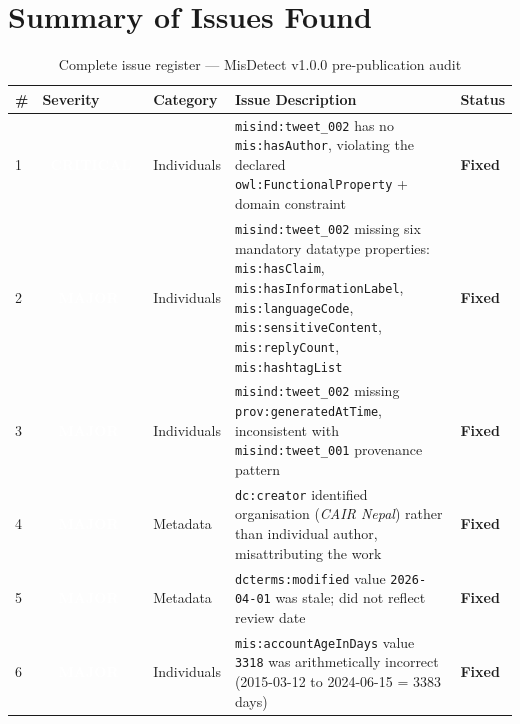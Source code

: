 \documentclass[11pt, a4paper]{article}
\newcommand{\badgeCritical}{\textcolor{white}{\colorbox{severity-critical}{\footnotesize\textbf{\ CRITICAL\ }}}}
\newcommand{\badgeMajor}{\textcolor{white}{\colorbox{severity-major}{\footnotesize\textbf{\ \ MAJOR\ \ }}}}
\newcommand{\prop}[1]{\texttt{mis:#1}}
\newcommand{\ind}[1]{\texttt{misind:#1}}
\begin{document}
\section{Summary of Issues Found}

\begin{table}[H]
\centering
\caption{Complete issue register --- MisDetect v1.0.0 pre-publication audit}
\label{tab:issue-register}
\setlength{\tabcolsep}{5pt}
\renewcommand{\arraystretch}{1.35}
\begin{tabularx}{\textwidth}{
  C{0.55cm}
  C{2.0cm}
  C{2.0cm}
  X
  C{1.4cm}
}
\textbf{\#} & \textbf{Severity} & \textbf{Category} & \textbf{Issue Description} & \textbf{Status} \\
 & \badgeCritical & Individuals    & \ind{tweet\_002} has no \prop{hasAuthor}, violating the declared \texttt{owl:FunctionalProperty} + domain constraint & \textcolor{severity-minor}{\textbf{Fixed}} \\
2 & \badgeMajor    & Individuals    & \ind{tweet\_002} missing six mandatory datatype properties:
                                       \prop{hasClaim}, \prop{hasInformationLabel}, \prop{languageCode},
                                       \prop{sensitiveContent}, \prop{replyCount}, \prop{hashtagList} & \textcolor{severity-minor}{\textbf{Fixed}} \\
3 & \badgeMajor    & Individuals    & \ind{tweet\_002} missing \texttt{prov:generatedAtTime}, inconsistent
                                       with \ind{tweet\_001} provenance pattern & \textcolor{severity-minor}{\textbf{Fixed}} \\
4 & \badgeMajor    & Metadata       & \texttt{dc:creator} identified organisation (\emph{CAIR Nepal}) rather
                                       than individual author, misattributing the work & \textcolor{severity-minor}{\textbf{Fixed}} \\
5 & \badgeMajor    & Metadata       & \texttt{dcterms:modified} value \texttt{2026-04-01} was stale;
                                       did not reflect review date & \textcolor{severity-minor}{\textbf{Fixed}} \\
6 & \badgeMajor    & Individuals    & \prop{accountAgeInDays} value \texttt{3318} was arithmetically incorrect
                                       (2015-03-12 to 2024-06-15 = 3383 days) & \textcolor{severity-minor}{\textbf{Fixed}} \\

\end{tabularx}
\end{table}
\end{document}
